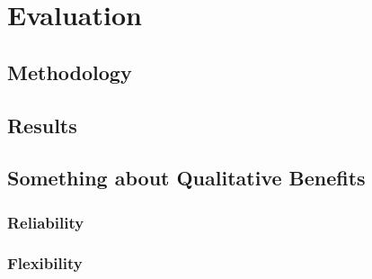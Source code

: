 \section{Evaluation}
\label{sec:eval}

\subsection {Methodology}

\subsection {Results}
\subsection{Something about Qualitative Benefits}
\subsubsection{Reliability}
\subsubsection{Flexibility}